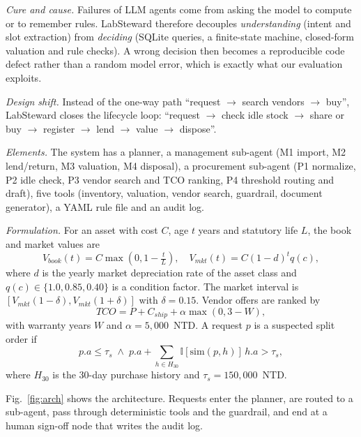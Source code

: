 \documentclass[conference]{IEEEtran}
\begin{document}
\textit{Cure and cause.} Failures of LLM agents come from asking the
model to compute or to remember rules. LabSteward therefore decouples
\emph{understanding} (intent and slot extraction) from \emph{deciding}
(SQLite queries, a finite-state machine, closed-form valuation and rule
checks). A wrong decision then becomes a reproducible code defect rather
than a random model error, which is exactly what our evaluation exploits.

\textit{Design shift.} Instead of the one-way path ``request $\rightarrow$
search vendors $\rightarrow$ buy'', LabSteward closes the lifecycle loop:
``request $\rightarrow$ check idle stock $\rightarrow$ share or buy
$\rightarrow$ register $\rightarrow$ lend $\rightarrow$ value $\rightarrow$
dispose''.

\textit{Elements.} The system has a planner, a management sub-agent
(M1 import, M2 lend/return, M3 valuation, M4 disposal), a procurement
sub-agent (P1 normalize, P2 idle check, P3 vendor search and TCO ranking,
P4 threshold routing and draft), five tools (inventory, valuation,
vendor search, guardrail, document generator), a YAML rule file and an
audit log.

\textit{Formulation.} For an asset with cost $C$, age $t$ years and
statutory life $L$, the book and market values are
\begin{equation}
V_{book}(t)=C\max\!\left(0,1-\tfrac{t}{L}\right),\quad
V_{mkt}(t)=C(1-d)^{t}q(c),
\label{eq:value}
\end{equation}
where $d$ is the yearly market depreciation rate of the asset class and
$q(c)\in\{1.0,0.85,0.40\}$ is a condition factor. The market interval is
$[V_{mkt}(1-\delta),V_{mkt}(1+\delta)]$ with $\delta=0.15$. Vendor offers
are ranked by
\begin{equation}
TCO=P+C_{ship}+\alpha\max(0,3-W),
\label{eq:tco}
\end{equation}
with warranty years $W$ and $\alpha=5{,}000$~NTD. A request $p$ is a
suspected split order if
\begin{equation}
p.a\le\tau_s \;\wedge\; p.a+\!\!\sum_{h\in H_{30}}\!\mathbb{I}[\mathrm{sim}(p,h)]\,h.a>\tau_s,
\label{eq:split}
\end{equation}
where $H_{30}$ is the 30-day purchase history and $\tau_s=150{,}000$~NTD.

Fig.~\ref{fig:arch} shows the architecture. Requests enter the planner,
are routed to a sub-agent, pass through deterministic tools and the
guardrail, and end at a human sign-off node that writes the audit log.
\end{document}
